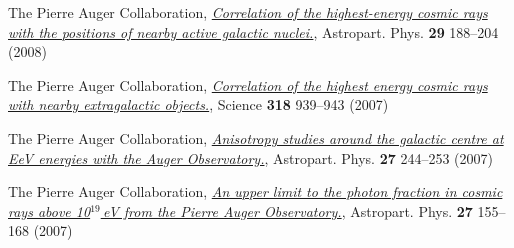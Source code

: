 \begin{etaremune}
\item {}The Pierre Auger Collaboration,
\href{http://dx.doi.org/10.1016/j.astropartphys.2008.01.002}{\emph{Correlation
of the highest-energy cosmic rays with the positions of nearby active galactic
nuclei.}}, Astropart. Phys. {\bf 29} 188--204 (2008)

\item {}The Pierre Auger Collaboration,
\href{http://dx.doi.org/10.1126/science.1151124}{\emph{Correlation of the
highest energy cosmic rays with nearby extragalactic objects.}}, Science {\bf
318} 939--943 (2007)

\item {}The Pierre Auger Collaboration,
\href{http://dx.doi.org/10.1016/j.astropartphys.2006.11.002}{\emph{Anisotropy
studies around the galactic centre at EeV energies with the Auger
Observatory.}},  Astropart. Phys. {\bf 27} 244--253 (2007)

\item {}The Pierre Auger Collaboration,
\href{http://dx.doi.org/10.1016/j.astropartphys.2006.10.004}{\emph{An upper
limit to the photon fraction in cosmic rays above 10$^{19}$\,eV from the Pierre
Auger Observatory.}}, Astropart. Phys. {\bf 27} 155--168 (2007)
\end{etaremune}
